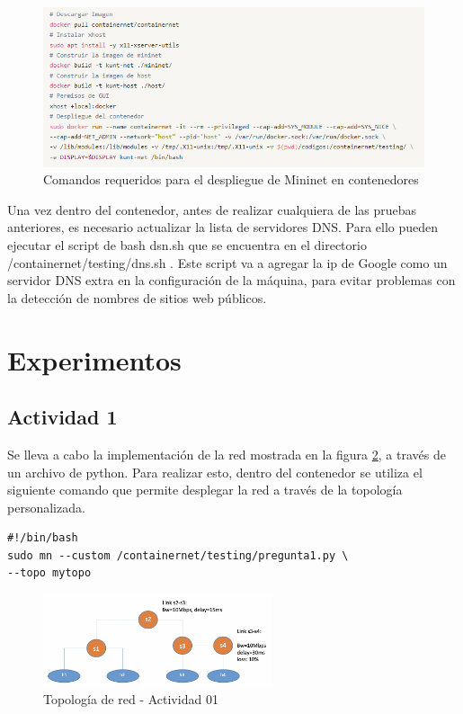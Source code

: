\documentclass[10pt]{article}
\begin{document}
\begin{figure}[H]
    \centering
    \includegraphics[width=\linewidth]{Imagenes/docker_run.png}
    \caption{Comandos requeridos para el despliegue de Mininet en contenedores}
    \label{fig:dockerrun}
\end{figure}
Una vez dentro del contenedor, antes de realizar cualquiera de las pruebas anteriores, es necesario actualizar la lista de servidores DNS. Para ello pueden ejecutar el script de bash dsn.sh que se encuentra en el directorio /containernet/testing/dns.sh . Este script va a agregar la ip de Google como un servidor DNS extra en la configuración de la máquina, para evitar problemas con la detección de nombres de sitios web públicos.


\section{Experimentos}

\subsection{Actividad 1}

\begin{multicols}{2}
Se lleva a cabo la implementación de la red mostrada en la figura \ref{fig:net01}, a través de un archivo de python. Para realizar esto, dentro del contenedor se utiliza el siguiente comando que permite desplegar la red a través de la topología personalizada.

\columnbreak

\begin{verbatim}
#!/bin/bash
sudo mn --custom /containernet/testing/pregunta1.py \
--topo mytopo
\end{verbatim}

\end{multicols}

\begin{figure}[H]
    \centering
    \includegraphics[width=0.6\textwidth]{Imagenes/item01_network.png}
    \caption{Topología de red - Actividad 01}
    \label{fig:net01}
\end{figure}
\end{document}
